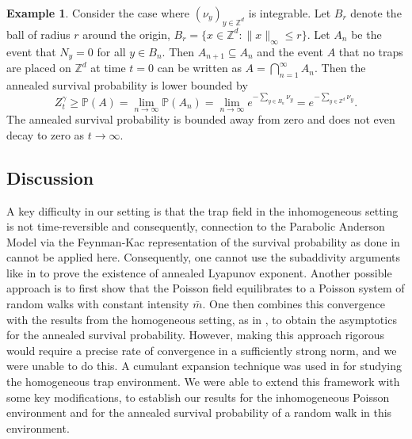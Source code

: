 \documentclass{article}[12pt]
\theoremstyle{definition}
\newtheorem{example}{Example}[section]
\newcommand{\Z}{\mathbb{Z}}
\newcommand{\pr}{\mathbb{P}}
\newcommand{\1}{\mathbbm{1}}
\begin{document}
\begin{example}
\label{ex:integrable}
    Consider the case where $(\nu_y)_{y\in \Z^d}$ is integrable. Let $B_r$ denote the ball of radius $r$ around the origin, $B_r = \{x\in \Z^d: \lVert x \rVert_\infty \le r\}$. Let $A_n$ be the event that $N_y = 0$ for all $y\in B_n$. Then $A_{n+1}\subseteq A_n$ and the event $A$ that no traps are placed on $\Z^d$ at time $t=0$ can be written as $A = \bigcap_{n=1}^{\infty}A_n$. Then the annealed survival probability is lower bounded by $$Z^\gamma_{t} \ge \pr(A) = \lim_{n\to \infty}\pr(A_n) = \lim_{n\to \infty} e^{-\sum_{y\in B_n}\nu_y} = e^{-\sum_{y\in \Z^d}\nu_y}.$$
    The annealed survival probability is bounded away from zero and does not even decay to zero as $t\to\infty$. 
\end{example}

\subsection{Discussion}\label{subsec:discuss}
 A key difficulty in our setting is that the trap field in the inhomogeneous setting is not time-reversible and consequently, connection to the Parabolic Anderson Model via the Feynman-Kac representation of the survival probability as done in \cite{DGRS2012} cannot be applied here. Consequently, one cannot use the subaddivity arguments like in \cite{DGRS2012} to prove the existence of annealed Lyapunov exponent. Another possible approach is to first show that the Poisson field equilibrates to a Poisson system of random walks with constant intensity $\bar{m}$. One then combines this convergence with the results from the homogeneous setting, as in \cite{DGRS2012}, to obtain the asymptotics for the annealed survival probability. However, making this approach rigorous would require a precise rate of convergence in a sufficiently strong norm, and we were unable to do this. A cumulant expansion technique was used in \cite{CG1984} for studying the homogeneous trap environment. We were able to extend this framework with some key modifications, to establish our results for the inhomogeneous Poisson environment and for the annealed survival probability of a random walk in this environment.
  
\end{document}
